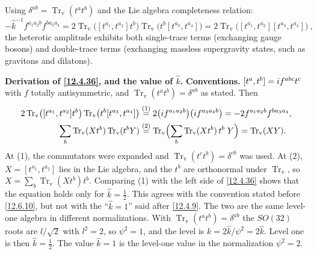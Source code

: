 \noindent Using $\delta^{ab} = \operatorname{Tr}_{\mathrm{v}}(t^{a}t^{b})$ and the Lie algebra completeness relation:
\begin{equation}
	-\hat{k}^{-1}f^{a_{1}a_{2}b}f^{b a_{3}a_{4}} = 2\operatorname{Tr}_{\mathrm{v}}\bigl([t^{a_{1}},t^{a_{2}}]t^{b}\bigr)\operatorname{Tr}_{\mathrm{v}}\bigl(t^{b}[t^{a_{3}},t^{a_{4}}]\bigr) = 2\operatorname{Tr}_{\mathrm{v}}\bigl([t^{a_{1}},t^{a_{2}}][t^{a_{3}},t^{a_{4}}]\bigr) \:, \label{12.4.36}
\end{equation}
the heterotic amplitude exhibits both single-trace terms (exchanging gauge bosons) and double-trace terms (exchanging massless supergravity states, such as gravitons and dilatons).

\begin{tcolorbox}[breakable]
	\begin{remark}
		\textbf{Derivation of \eqref{12.4.36}, and the value of $\hat k$.} \textbf{Conventions.} $[t^{a},t^{b}]=i f^{abc}t^{c}$ with $f$ totally antisymmetric, and $\operatorname{Tr}_{\mathrm{v}}(t^{a}t^{b})=\delta^{ab}$ as stated. Then
		\begin{align*}
			2\operatorname{Tr}_{\mathrm{v}}\bigl([t^{a_1},t^{a_2}]t^{b}\bigr)\operatorname{Tr}_{\mathrm{v}}\bigl(t^{b}[t^{a_3},t^{a_4}]\bigr)
			&\overset{(1)}{=} 2\bigl(i f^{a_1a_2b}\bigr)\bigl(i f^{a_3a_4b}\bigr)=-2f^{a_1a_2b}f^{ba_3a_4} ,\\
			\sum_{b}\operatorname{Tr}_{\mathrm{v}}(Xt^{b})\operatorname{Tr}_{\mathrm{v}}(t^{b}Y)
			&\overset{(2)}{=} \operatorname{Tr}_{\mathrm{v}}\Bigl(\sum_{b}\operatorname{Tr}_{\mathrm{v}}(Xt^{b})\,t^{b}\;Y\Bigr)=\operatorname{Tr}_{\mathrm{v}}(XY) .
		\end{align*}
		At (1), the commutators were expanded and $\operatorname{Tr}_{\mathrm{v}}(t^{c}t^{b})=\delta^{cb}$ was used. At (2), $X=[t^{a_1},t^{a_2}]$ lies in the Lie algebra, and the $t^{b}$ are orthonormal under $\operatorname{Tr}_{\mathrm{v}}$, so $X=\sum_{b}\operatorname{Tr}_{\mathrm{v}}(Xt^{b})t^{b}$. Comparing (1) with the left side of \eqref{12.4.36} shows that the equation holds only for $\hat k=\frac12$. This agrees with the convention stated before \eqref{12.6.10}, but not with the ``$\hat k=1$'' said after \eqref{12.4.9}. The two are the same level-one algebra in different normalizations. With $\operatorname{Tr}_{\mathrm{v}}(t^{a}t^{b})=\delta^{ab}$ the $SO(32)$ roots are $l/\sqrt2$ with $l^{2}=2$, so $\psi^{2}=1$, and the level is $k=2\hat k/\psi^{2}=2\hat k$. Level one is then $\hat k=\frac12$. The value $\hat k=1$ is the level-one value in the normalization $\psi^{2}=2$.
	\end{remark}
\end{tcolorbox}


